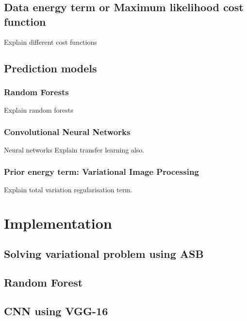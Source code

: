 \section{Data energy term or Maximum likelihood cost function}
Explain different cost functions

\section{Prediction models}
\subsection{Random Forests}
Explain random forests
\subsection{Convolutional Neural Networks}
Neural networks
Explain transfer learning also.

\subsection{Prior energy term: Variational Image Processing}
Explain total variation regularisation term.


\chapter{Implementation}
\section{Solving variational problem using ASB}
\section{Random Forest}
\section{CNN using VGG-16}